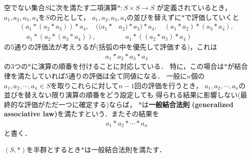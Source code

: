 	\begin{sketch}
		
	\end{sketch}
	
	\begin{screen}
		\begin{dfn}[一般結合法則]
			空でない集合$S$に次を満たす二項演算$\ast:S \times S \longrightarrow S$
			が定義されているとき，$a_1,a_2,a_3,a_4$を$S$の元として，
			$a_1,a_2,a_3,a_4$の並びを替えずに$\ast$で評価していくと
			\begin{align}
				(a_1 \ast (a_2 \ast a_3)) \ast a_4,
				\quad ((a_1 \ast &a_2) \ast a_3) \ast a_4,
				\quad (a_1 \ast a_2) \ast (a_3 \ast a_4), \\
				\quad a_1 \ast (a_2 \ast (a_3 \ast a_4)),
				&\quad a_1 \ast ((a_2 \ast a_3) \ast a_4)
			\end{align}
			の5通りの評価法が考えうるが(括弧の中を優先して評価する)，これは
			\begin{align}
				a_1 \ast a_2 \ast a_3 \ast a_4
			\end{align}
			の3つの$\ast$に演算の順番を付けることに対応している．
			特に，この場合は$\ast$が結合律を満たしていれば5通りの評価は全て同値になる．
			一般に$n$個の$a_1,a_2,\cdots,a_n \in S$を取りこれらに対して$n-1$回の評価を行うとき，
			$a_1,a_2,\cdots,a_n$の並びを替えない限り演算の順番をどう設定しても
			得られる結果に影響しない(最終的な評価がただ一つに確定する)ならば，
			$\ast$は{\bf 一般結合法則}
			{\bf (generalized associative law)}を満たすという．またその結果を
			\begin{align}
				a_1 \ast a_2 \ast \cdots \ast a_n
			\end{align}
			と書く．
		\end{dfn}
	\end{screen}
	
	\begin{screen}
		\begin{thm}[結合法則から一般結合法則が従う]
		\label{thm:generalized_associative_law_on_semigroup}
			$(S,\ast)$を半群とするとき$\ast$は一般結合法則を満たす．
		\end{thm}
	\end{screen}
	
